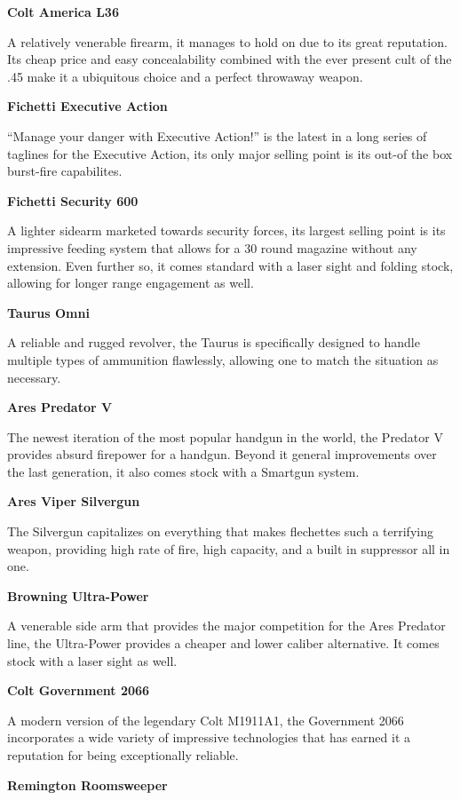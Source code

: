 \begin{mdframed}[linewidth=0pt]
\begin{multicols}{2}
		\textbf{Colt America L36}
		
		A relatively venerable firearm, it manages to hold on due to its great reputation. Its cheap price and easy concealability combined with the ever present cult of the .45 make it a ubiquitous choice and a perfect throwaway weapon.
		
		\textbf{Fichetti Executive Action}
		
		“Manage your danger with Executive Action!” is the latest in a long series of taglines for the Executive Action, its only major selling point is its out-of the box burst-fire capabilites.
		
		\textbf{Fichetti Security 600}
		
		A lighter sidearm marketed towards security forces, its largest selling point is its impressive feeding system that allows for a 30 round magazine without any extension. Even further so, it comes standard with a laser sight and folding stock, allowing for longer range engagement as well.
		
		\textbf{Taurus Omni}
		
		A reliable and rugged revolver, the Taurus is specifically designed to handle multiple types of ammunition flawlessly, allowing one to match the situation as necessary.
		
		\textbf{Ares Predator V}
		
		The newest iteration of the most popular handgun in the world, the Predator V provides absurd firepower for a handgun. Beyond it general improvements over the last generation, it also comes stock with a Smartgun system.
		
		\textbf{Ares Viper Silvergun}
		
		The Silvergun capitalizes on everything that makes flechettes such a terrifying weapon, providing high rate of fire, high capacity, and a built in suppressor all in one.
		
		\textbf{Browning Ultra-Power}
		
		A venerable side arm that provides the major competition for the Ares Predator line, the Ultra-Power provides a cheaper and lower caliber alternative. It comes stock with a laser sight as well.
		
		\textbf{Colt Government 2066}
		
		A modern version of the legendary Colt M1911A1, the Government 2066 incorporates a wide variety of impressive technologies that has earned it a reputation for being exceptionally reliable.
		
		\textbf{Remington Roomsweeper}
		

\end{multicols}
\end{mdframed}
